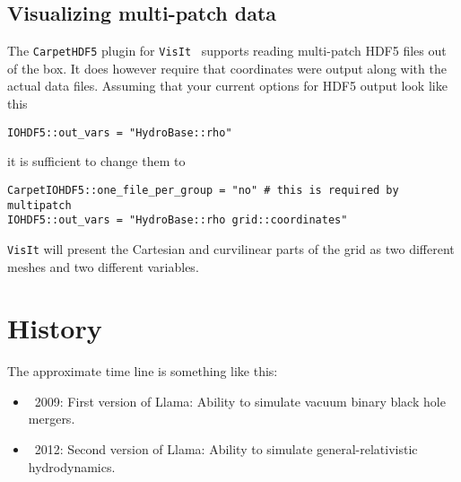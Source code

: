 \documentclass{article}
\begin{document}
\subsection{Visualizing multi-patch data}
The \texttt{CarpetHDF5} plugin for \texttt{VisIt}~\cite{Llama_VisIt:web}
supports reading multi-patch
HDF5 files out of the box. It does however require that coordinates were
output along with the actual data files. Assuming that your current options
for HDF5 output look like this
\begin{verbatim}
IOHDF5::out_vars = "HydroBase::rho"
\end{verbatim}
it is sufficient to change them to
\begin{verbatim}
CarpetIOHDF5::one_file_per_group = "no" # this is required by multipatch
IOHDF5::out_vars = "HydroBase::rho grid::coordinates"
\end{verbatim}
\texttt{VisIt} will present the Cartesian and curvilinear parts of the grid as
two different meshes and two different variables.





\section{History}

The approximate time line is something like this:
\begin{itemize}
\item ~2009: First version of Llama: Ability to simulate vacuum binary black hole mergers.
\item ~2012: Second version of Llama: Ability to simulate general-relativistic hydrodynamics.
\end{itemize}






\end{document}
